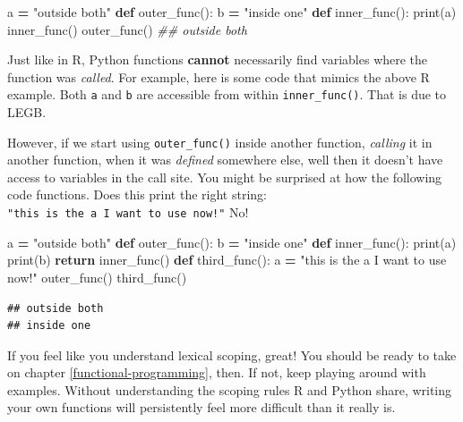 \documentclass[
  12pt,
]{krantz}
\makeatletter
\newenvironment{Shaded}{\begin{snugshade}}{\end{snugshade}}
\newcommand{\BuiltInTok}[1]{#1}
\newcommand{\CommentTok}[1]{\textcolor[rgb]{0.37,0.37,0.37}{\textit{#1}}}
\newcommand{\ControlFlowTok}[1]{\textcolor[rgb]{0.27,0.27,0.27}{\textbf{#1}}}
\newcommand{\KeywordTok}[1]{\textcolor[rgb]{0.27,0.27,0.27}{\textbf{#1}}}
\newcommand{\NormalTok}[1]{#1}
\newcommand{\OperatorTok}[1]{\textcolor[rgb]{0.43,0.43,0.43}{\textbf{#1}}}
\newcommand{\StringTok}[1]{\textcolor[rgb]{0.5,0.5,0.5}{#1}}
\newenvironment{kframe}{%
\medskip{}
\setlength{\fboxsep}{.8em}
 \def\at@end@of@kframe{}%
 \ifinner\ifhmode%
  \def\at@end@of@kframe{\end{minipage}}%
  \begin{minipage}{\columnwidth}%
 \fi\fi%
 \def\FrameCommand##1{\hskip\@totalleftmargin \hskip-\fboxsep
 \colorbox{shadecolor}{##1}\hskip-\fboxsep
     \hskip-\linewidth \hskip-\@totalleftmargin \hskip\columnwidth}%
 \MakeFramed {\advance\hsize-\width
   \@totalleftmargin\z@ \linewidth\hsize
   \@setminipage}}%
 {\par\unskip\endMakeFramed%
 \at@end@of@kframe}
\renewenvironment{Shaded}{\begin{kframe}}{\end{kframe}}
\makeatother
\begin{document}
\begin{Shaded}
\begin{Highlighting}[]
\NormalTok{a }\OperatorTok{=} \StringTok{"outside both"}
\KeywordTok{def}\NormalTok{ outer\_func():}
\NormalTok{  b }\OperatorTok{=} \StringTok{"inside one"}
  \KeywordTok{def}\NormalTok{ inner\_func():}
    \BuiltInTok{print}\NormalTok{(a) }
\NormalTok{  inner\_func()}
\NormalTok{outer\_func()}
\CommentTok{\#\# outside both}
\end{Highlighting}
\end{Shaded}

Just like in R, Python functions \textbf{cannot} necessarily find variables where the function was \emph{called}. For example, here is some code that mimics the above R example. Both \texttt{a} and \texttt{b} are accessible from within \texttt{inner\_func()}. That is due to LEGB.

However, if we start using \texttt{outer\_func()} inside another function, \emph{calling} it in another function, when it was \emph{defined} somewhere else, well then it doesn't have access to variables in the call site. You might be surprised at how the following code functions. Does this print the right string: \texttt{"this\ is\ the\ a\ I\ want\ to\ use\ now!"} No!

\begin{Shaded}
\begin{Highlighting}[]
\NormalTok{a }\OperatorTok{=} \StringTok{"outside both"}
\KeywordTok{def}\NormalTok{ outer\_func():}
\NormalTok{  b }\OperatorTok{=} \StringTok{"inside one"}
  \KeywordTok{def}\NormalTok{ inner\_func():}
    \BuiltInTok{print}\NormalTok{(a) }
    \BuiltInTok{print}\NormalTok{(b)}
  \ControlFlowTok{return}\NormalTok{ inner\_func() }
\KeywordTok{def}\NormalTok{ third\_func():}
\NormalTok{  a }\OperatorTok{=} \StringTok{"this is the a I want to use now!"}
\NormalTok{  outer\_func()}
\NormalTok{third\_func() }
\end{Highlighting}
\end{Shaded}

\begin{verbatim}
## outside both
## inside one
\end{verbatim}

If you feel like you understand lexical scoping, great! You should be ready to take on chapter \ref{functional-programming}, then. If not, keep playing around with examples. Without understanding the scoping rules R and Python share, writing your own functions will persistently feel more difficult than it really is.
\end{document}
